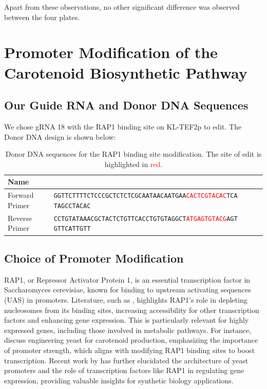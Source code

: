 \documentclass[12pt,a4paper]{article}
\begin{document}
Apart from these observations, no other significant difference was observed
between the four plates.

\section{Promoter Modification of the Carotenoid Biosynthetic Pathway}
\subsection{Our Guide RNA and Donor DNA Sequences}
We chose gRNA 18 with the RAP1 binding site on KL-TEF2p to edit. The Donor DNA
design is shown below:
\begin{table}[h]
    \centering
    \begin{tabular}{|p{3cm}|p{11cm}|}
        \hline
        \textbf{Name}  & \textbf{\centering{Sequence}}                                               \\
        \hline
        Forward Primer & \texttt{GGTTCTTTTCTCCCGCTCTCTCGCAATAACAATGAA\textcolor{red}{CACTCGTACAC}TCA
        TAGCCTACAC}                                                                                  \\
        \hline
        Reverse Primer & \texttt{CCTGTATAAACGCTACTCTGTTCACCTGTGTAGGCT\textcolor{red}{ATGAGTGTACG}AGT
        GTTCATTGTT}                                                                                  \\
        \hline
    \end{tabular}
    \caption{\centering Donor DNA sequences for the RAP1 binding site modification. The site of edit is highlighted in \textcolor{red}{red}.}\label{tab:exp_3_sequences}
\end{table}

\subsection{Choice of Promoter Modification}
RAP1, or Repressor Activator Protein 1, is an essential transcription factor in
Saccharomyces cerevisiae, known for binding to upstream activating sequences
(UAS) in promoters. Literature, such as \citet{Gonzalez2020}, highlights RAP1's
role in depleting nucleosomes from its binding sites, increasing accessibility
for other transcription factors and enhancing gene expression. This is
particularly relevant for highly expressed genes, including those involved in
metabolic pathways. For instance, \citet{Miura1998} discuss engineering yeast
for carotenoid production, emphasizing the importance of promoter strength,
which aligns with modifying RAP1 binding sites to boost transcription. Recent
work by \citet{Tang2020} has further elucidated the architecture of yeast
promoters and the role of transcription factors like RAP1 in regulating gene
expression, providing valuable insights for synthetic biology applications.
\end{document}
